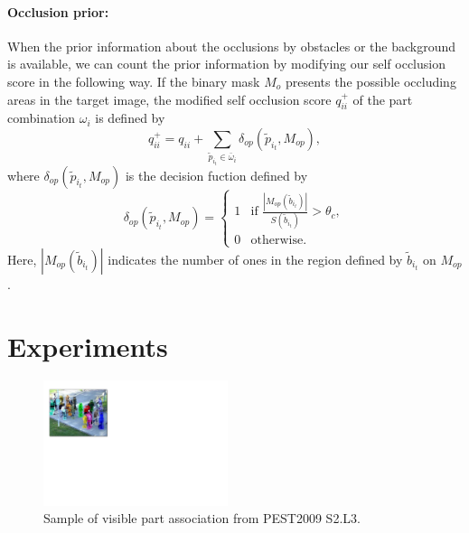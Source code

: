 \documentclass[10pt,twocolumn,letterpaper]{article}
\begin{document}
\paragraph{Occlusion prior:}
When the prior information about the occlusions by obstacles or the background is available, we can count the prior information by modifying our self occlusion score in the following way.
If the binary mask $M_o$ presents the possible occluding areas in the target image, the modified self occlusion score $q_{ii}^+$ of the part combination $\omega_i$ is defined by
\begin{equation}
   \label{eq:occlusion_prior_score}
   q_{ii}^+ = q_{ii} + \sum_{\tilde{p}_{i_t} \in \bar{\omega}_i} \delta_{op}(\tilde{p}_{i_t}, M_{op}),
\end{equation}
where $\delta_{op}(\tilde{p}_{i_t}, M_{op})$ is the decision fuction defined by
\begin{equation}
   \label{eq:occlusion_prior_count_function}
   \delta_{op}(\tilde{p}_{i_t}, M_{op}) = 
    \begin{cases}
      1 & \text{if $\frac{|M_{op}(\tilde{b}_{i_t})|}{S(\tilde{b}_{i_t})} > \theta_c $}, \\
      0 & \text{otherwise}.
   \end{cases}
\end{equation}
Here, $|M_{op}(\tilde{b}_{i_t})|$ indicates the number of ones in the region defined by $\tilde{b}_{i_t}$ on $M_{op}$.



\section{Experiments}
\begin{figure}[t]
   \includegraphics[width=0.48\textwidth]{../figures/visible_part_association.pdf}
   \caption{Sample of visible part association from PEST2009 S2.L3.}
   \label{fig:visible_part_association}
\end{figure}
\end{document}
